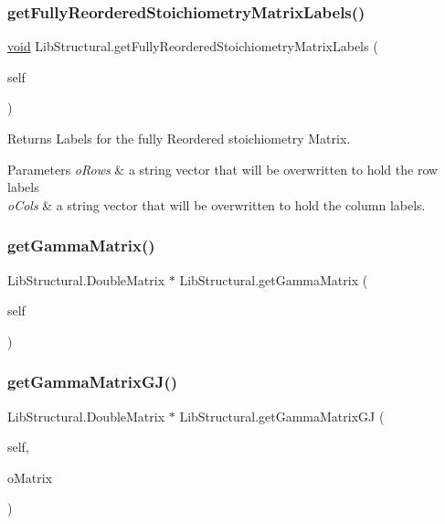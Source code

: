\subsubsection{\texorpdfstring{get\+Fully\+Reordered\+Stoichiometry\+Matrix\+Labels()}{getFullyReorderedStoichiometryMatrixLabels()}}
{\footnotesize\ttfamily \hyperlink{lp__lib_8h_ac7828c7b2b31d2e11af17bdb6289c5d9}{void} Lib\+Structural.\+get\+Fully\+Reordered\+Stoichiometry\+Matrix\+Labels (\begin{DoxyParamCaption}\item[{}]{self }\end{DoxyParamCaption})}



Returns Labels for the fully Reordered stoichiometry Matrix. 


\begin{DoxyParams}{Parameters}
{\em o\+Rows} & a string vector that will be overwritten to hold the row labels \\
\hline
{\em o\+Cols} & a string vector that will be overwritten to hold the column labels. \\
\hline
\end{DoxyParams}
\mbox{\label{classstructural_1_1_lib_structural_af46ef451e4797bfeaf9625652702b2c3}} 
\subsubsection{\texorpdfstring{get\+Gamma\+Matrix()}{getGammaMatrix()}}
{\footnotesize\ttfamily Lib\+Structural.\+Double\+Matrix $\ast$ Lib\+Structural.\+get\+Gamma\+Matrix (\begin{DoxyParamCaption}\item[{}]{self }\end{DoxyParamCaption})}

\mbox{\label{classstructural_1_1_lib_structural_a548930daec871db97f9223654b0a69fd}} 
\subsubsection{\texorpdfstring{get\+Gamma\+Matrix\+G\+J()}{getGammaMatrixGJ()}}
{\footnotesize\ttfamily Lib\+Structural.\+Double\+Matrix $\ast$ Lib\+Structural.\+get\+Gamma\+Matrix\+GJ (\begin{DoxyParamCaption}\item[{}]{self,  }\item[{}]{o\+Matrix }\end{DoxyParamCaption})}

